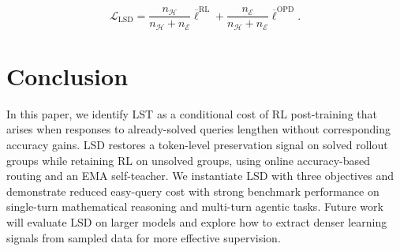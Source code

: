 \documentclass{article} %
\begin{document}
\begin{equation}
  \mathcal L_{\mathrm{LSD}}
  =
  \frac{n_{\mathcal H}}
       {n_{\mathcal H}+n_{\mathcal E}}
  \overline{\ell}^{\mathrm{RL}}
  +
  \frac{n_{\mathcal E}}
       {n_{\mathcal H}+n_{\mathcal E}}
  \overline{\ell}^{\mathrm{OPD}}.
  \label{eq:lsd-objective}
\end{equation}




\section{Conclusion}
In this paper, we identify LST as a conditional cost of RL post-training that arises when responses to already-solved queries lengthen without corresponding accuracy gains. LSD restores a token-level preservation signal on solved rollout groups while retaining RL on unsolved groups, using online accuracy-based routing and an EMA self-teacher. We instantiate LSD with three objectives and demonstrate reduced easy-query cost with strong benchmark performance on single-turn mathematical reasoning and multi-turn agentic tasks. Future work will evaluate LSD on larger models and explore how to extract denser learning signals from sampled data for more effective supervision.
\FloatBarrier
\clearpage




\clearpage
\appendix

\clearpage

\FloatBarrier


\clearpage


\clearpage


\clearpage

\end{document}
